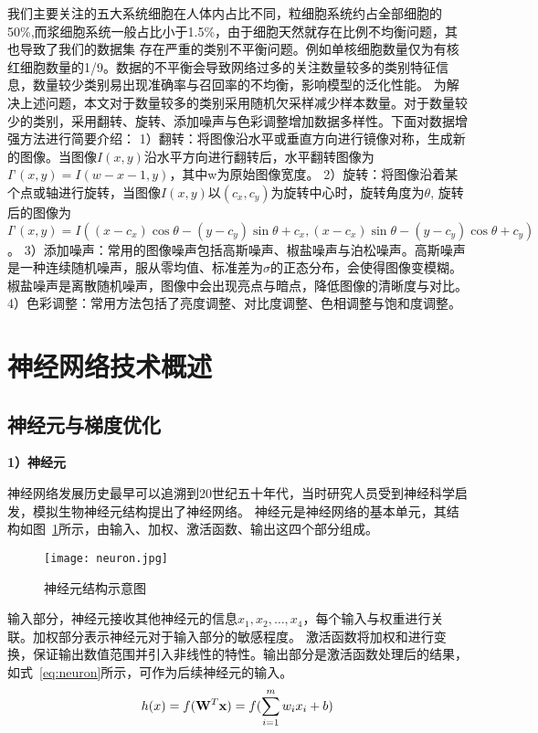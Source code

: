 我们主要关注的五大系统细胞在人体内占比不同，粒细胞系统约占全部细胞的50\%,而浆细胞系统一般占比小于1.5\%，由于细胞天然就存在比例不均衡问题，其也导致了我们的数据集
存在严重的类别不平衡问题。例如单核细胞数量仅为有核红细胞数量的1/9。数据的不平衡会导致网络过多的关注数量较多的类别特征信息，数量较少类别易出现准确率与召回率的不均衡，影响模型的泛化性能。
为解决上述问题，本文对于数量较多的类别采用随机欠采样减少样本数量。对于数量较少的类别，采用翻转、旋转、添加噪声与色彩调整增加数据多样性。下面对数据增强\cite{shorten2019survey}方法进行简要介绍：
1）翻转：将图像沿水平或垂直方向进行镜像对称，生成新的图像。当图像$I(x,y)$沿水平方向进行翻转后，水平翻转图像为$I’(x, y)=I(w-x-1,y)$，其中w为原始图像宽度。
2）旋转：将图像沿着某个点或轴进行旋转，当图像$I(x,y)$以$(c_x, c_y)$为旋转中心时，旋转角度为$\theta$, 旋转后的图像为$I’(x, y)=I((x - c_x)\cos\theta - (y - c_y)\sin\theta + c_x, (x - c_x)\sin\theta - (y - c_y)\cos\theta + c_y)$。
3）添加噪声：常用的图像噪声包括高斯噪声、椒盐噪声与泊松噪声。高斯噪声是一种连续随机噪声，服从零均值、标准差为$\sigma$的正态分布，会使得图像变模糊。
椒盐噪声是离散随机噪声，图像中会出现亮点与暗点，降低图像的清晰度与对比。
4）色彩调整：常用方法包括了亮度调整、对比度调整、色相调整与饱和度调整。

\section{神经网络技术概述}
\subsection{神经元与梯度优化}

\textbf{1）神经元}

神经网络发展历史最早可以追溯到20世纪五十年代，当时研究人员受到神经科学启发，模拟生物神经元结构提出了神经网络。
神经元是神经网络的基本单元，其结构如图~\ref{fig:neuron}所示，由输入、加权、激活函数、输出这四个部分组成。
\begin{figure}[htbp]
  \centering
  \texttt{[image: neuron.jpg]}
  \caption{神经元结构示意图}
  \label{fig:neuron}
\end{figure}

输入部分，神经元接收其他神经元的信息$x_1, x_2, \dots, x_4$，每个输入与权重进行关联。加权部分表示神经元对于输入部分的敏感程度。
激活函数将加权和进行变换，保证输出数值范围并引入非线性的特性。输出部分是激活函数处理后的结果，如式~\ref{eq:neuron}所示，可作为后续神经元的输入。
\begin{equation}
  h(x) = f({{\bf{W}}^T}{\bf{x}}) = f(\sum\limits_{i = 1}^m {{w_i}{x_i} + b})
  \label{eq:neuron}
\end{equation}

